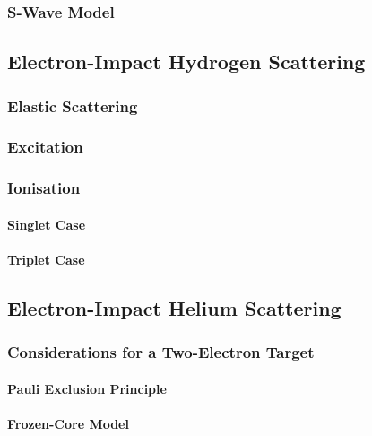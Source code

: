\documentclass[draft]{article}
\begin{document}
\subsubsection{S-Wave Model}
\label{sec:s-wave-model}

\subsection{Electron-Impact Hydrogen Scattering}
\label{sec:e-h}

\subsubsection{Elastic Scattering}
\label{sec:e-h-elastic-scattering}

\subsubsection{Excitation}
\label{sec:e-h-excitation}

\subsubsection{Ionisation}
\label{sec:e-h-ionisation}

\paragraph{Singlet Case}

\paragraph{Triplet Case}

\subsection{Electron-Impact Helium Scattering}
\label{sec:e-he}

\subsubsection{Considerations for a Two-Electron Target}
\label{sec:2e-target}

\paragraph{Pauli Exclusion Principle}

\paragraph{Frozen-Core Model}
\end{document}
